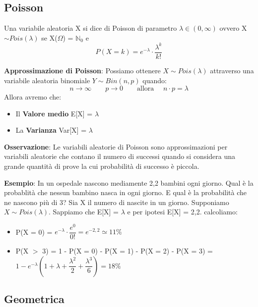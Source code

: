 \subsection{Poisson}

Una variabile aleatoria X si dice di Poisson di parametro $\lambda \in (0, \infty)$ ovvero X $\sim Pois(\lambda)$ se X($\Omega$) = $\mathbb{N}_0$ e $$P(X = k) = e^{- \lambda} \cdot \dfrac{\lambda^k}{k!}$$

\noindent \textbf{Approssimazione di Poisson}: Possiamo ottenere $X \sim Pois(\lambda)$ attraverso una variabile aleatoria binomiale $ Y \sim Bin(n,p)$ quando: $$ n \xrightarrow{} \infty \qquad p \xrightarrow{} 0 \qquad \text{allora } \quad n \cdot p = \lambda$$ 
Allora avremo che:
\begin{itemize}
    \item Il \textbf{Valore medio} E[X] = $\lambda$
    \item La \textbf{Varianza} Var[X] = $\lambda$
\end{itemize}

\noindent \textbf{Osservazione}: Le variabili aleatorie di Poisson sono approssimazioni per variabili aleatorie che contano il numero di successi quando si considera una grande quantità di prove la cui probabilità di successo è piccola. \newline

\begin{tcolorbox}
    \textbf{Esempio}: In un ospedale nascono mediamente 2,2 bambini ogni giorno. Qual è la probablità che nessun bambino nasca in ogni giorno. E qual è la probabilità che ne nascono più di 3? \newline
    Sia X il numero di nascite in un giorno. Supponiamo $ X \sim Pois(\lambda)$. Sappiamo che E[X] = $\lambda$ e per ipotesi E[X] = 2,2. calcoliamo:
    \begin{itemize}
        \item P(X = 0) = $e^{- \lambda} \cdot \dfrac{e^0}{0!} = e^{-2,2} \simeq 11\%$
        \item P(X $>$ 3) = 1 - P(X = 0) - P(X = 1) - P(X = 2) - P(X = 3) = $1 - e^{- \lambda} (1 + \lambda + \dfrac{\lambda^2}{2} + \dfrac{\lambda^3}{6}) = 18\% $
    \end{itemize}
\end{tcolorbox}

\subsection{Geometrica}

